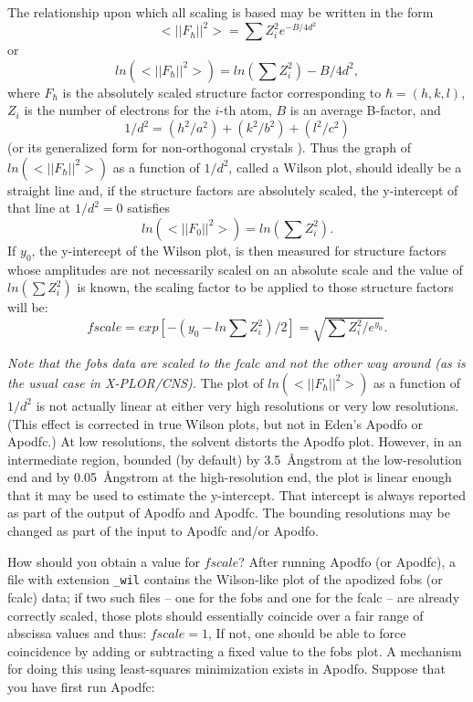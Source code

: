 \documentclass{report}
\begin{document}
The relationship upon which all scaling is based may be written in the form
$$ <||F_{\hbar}||^2> = \sum{Z_i^2} e^{-B/4d^2} $$
or
$$ ln (<||F_{\hbar}||^2>) = ln (\sum{Z_i^2}) - B/4d^2, $$
where $F_{\hbar}$ is the absolutely scaled structure factor 
corresponding to $\hbar = (h, k, l)$, 
$Z_i$ is the number of electrons for the $i$-th atom, 
$B$ is an average B-factor, and 
$$ 1/d^2 = (h^2/a^2) + (k^2/b^2) + (l^2/c^2) $$
(or its generalized form for non-orthogonal crystals \cite{glusker}).  
Thus the graph of $ ln (<||F_{\hbar}||^2>) $ 
as a function of $ 1/d^2 $, called a Wilson plot, should ideally be a straight line and,
if the structure factors are absolutely scaled, 
the y-intercept of that line
at $1/d^2 = 0$ satisfies 
$$      ln (<||F_0||^2>) = ln(\sum{Z_i^2}).  $$
If $y_0$, the y-intercept of the Wilson plot, is then measured for 
structure factors
whose amplitudes are not necessarily scaled on an absolute scale
and the value of $ln(\sum{Z_i^2})$ is known, the scaling factor  
to be applied to those structure factors will be:
$$ fscale = exp[-(y_0 - ln\sum{Z_i^2})/2] = \sqrt{\sum{Z_i^2}/e^{y_0}}. $$
\vspace {0.1in}

{\em Note that the fobs data are scaled to the fcalc 
and not the other way around 
(as is the usual case in X-PLOR/CNS).}
The plot of $ ln(<||F_{\hbar}||^2>) $ as a function of $1/d^2 $
is not actually linear at either very high resolutions or very low resolutions.
(This effect is corrected in true Wilson plots, 
but not in Eden's Apodfo or Apodfc.)
At low resolutions, the solvent distorts the Apodfo plot.  
However, in an intermediate region, 
bounded (by default) by 3.5~\AA ngstrom at the low-resolution end
and by 0.05~\AA ngstrom at the high-resolution end,
the plot is linear enough that it may be used to estimate
the y-intercept.  That intercept is always reported as part of the 
output of Apodfo and Apodfc.
The bounding resolutions may be changed as
part of the input to Apodfc and/or Apodfo.

\vspace {0.1in}

How should you obtain a value for $fscale$?
After running Apodfo (or Apodfc), a file with extension {\tt \_wil}
contains the Wilson-like plot of the apodized fobs (or fcalc) data; 
if two such files -- one for the fobs and one for the fcalc --
are already correctly scaled, those plots should essentially coincide
over a fair range of abscissa values and thus: $fscale = 1$, 
If not, one should be able to force coincidence by adding or subtracting
a fixed value to the fobs plot.  A mechanism for doing this using  least-squares
minimization exists in Apodfo.
Suppose that you have first run Apodfc:
\end{document}
